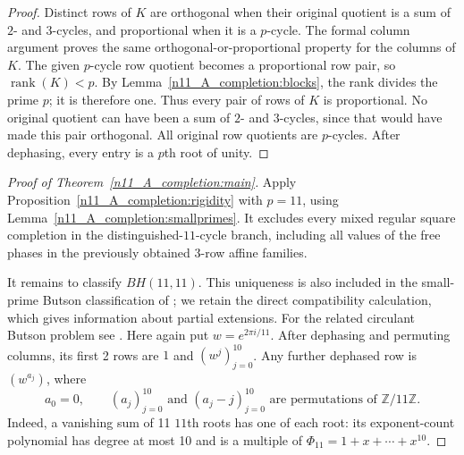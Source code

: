 \documentclass[11pt,a4paper]{article}
\theoremstyle{plain}
\theoremstyle{definition}
\theoremstyle{plain}
\begin{document}
\begin{proof}
Distinct rows of $K$ are orthogonal when their original quotient is a sum of $2$- and $3$-cycles, and proportional when it is a $p$-cycle. The formal column argument proves the same orthogonal-or-proportional property for the columns of $K$. The given $p$-cycle row quotient becomes a proportional row pair, so $\operatorname{rank}(K)<p$. By Lemma~\ref{n11_A_completion:blocks}, the rank divides the prime $p$; it is therefore one. Thus every pair of rows of $K$ is proportional. No original quotient can have been a sum of $2$- and $3$-cycles, since that would have made this pair orthogonal. All original row quotients are $p$-cycles. After dephasing, every entry is a $p$th root of unity.
\end{proof}

\begin{proof}[Proof of Theorem~\ref{n11_A_completion:main}]
Apply Proposition~\ref{n11_A_completion:rigidity} with $p=11$, using Lemma~\ref{n11_A_completion:smallprimes}. It excludes every mixed regular square completion in the distinguished-$11$-cycle branch, including all values of the free phases in the previously obtained 3-row affine families.

\medskip\label{sec:A_fourier}
It remains to classify $BH(11,11)$. This uniqueness is also included in the small-prime Butson classification of \cite{hkm}; we retain the direct compatibility calculation, which gives information about partial extensions. For the related circulant Butson problem see \cite{hsc}. Here again put $w=e^{2\pi i/11}$. After dephasing and permuting columns, its first 2 rows are $1$ and $(w^{j})_{j=0}^{10}$. Any further dephased row is $(w^{a_j})$, where
$$a_0=0,\qquad (a_j)_{j=0}^{10}\text{ and }(a_j-j)_{j=0}^{10} \text{ are permutations of }\mathbb{Z}/11\mathbb{Z}.$$
Indeed, a vanishing sum of 11 $11$th roots has one of each root: its exponent-count polynomial has degree at most 10 and is a multiple of $\Phi_{11}=1+x+\cdots+x^{10}$.


\end{proof}
\end{document}
